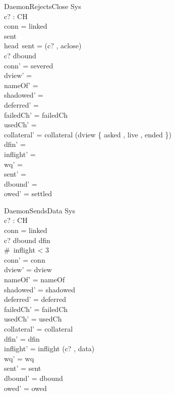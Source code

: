 \documentclass[a4paper,10pt,fleqn]{article}
\begin{document}
\begin{schema}{DaemonRejectsClose}
  \Delta Sys \\
  c? : CH \\
\where
  conn = linked \\
  sent \neq \langle \rangle \\
  head~sent = (c? , aclose) \\
  c? \notin \dom dbound \\
  conn' = severed \\
  dview' = \emptyset \\
  nameOf' = \emptyset \\
  shadowed' = \emptyset \\
  deferred' = \emptyset \\
  failedCh' = failedCh \\
  usedCh' = \emptyset \\
  collateral' = collateral \cup \dom (dview \rres \{ asked , live , ended \}) \\
  dfin' = \emptyset \\
  inflight' = \langle \rangle \\
  wq' = \langle \rangle \\
  sent' = \langle \rangle \\
  dbound' = \emptyset \\
  owed' = settled
\end{schema}

\begin{schema}{DaemonSendsData}
  \Delta Sys \\
  c? : CH \\
\where
  conn = linked \\
  c? \in \dom dbound \setminus dfin \\
  \#~inflight < 3 \\
  conn' = conn \\
  dview' = dview \\
  nameOf' = nameOf \\
  shadowed' = shadowed \\
  deferred' = deferred \\
  failedCh' = failedCh \\
  usedCh' = usedCh \\
  collateral' = collateral \\
  dfin' = dfin \\
  inflight' = inflight \cat \langle (c? , data) \rangle \\
  wq' = wq \\
  sent' = sent \\
  dbound' = dbound \\
  owed' = owed
\end{schema}
\end{document}

